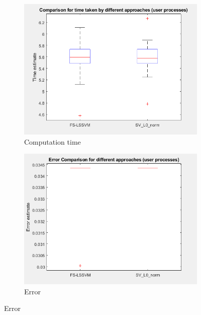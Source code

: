 \documentclass{article}
\begin{document}
        
        \begin{figure}[h]
             \centering
             \begin{subfigure}[b]{0.3\textwidth}
                 \centering
                 \includegraphics[width=\textwidth]{Assignment 3/figures/1_3/time.png}
                 \caption{Computation time}
                 \label{fig:l0computation_time}
             \end{subfigure}
            \hfill
             \begin{subfigure}[b]{0.3\textwidth}
                 \centering
                 \includegraphics[width=\textwidth]{Assignment 3/figures/1_3/error.png}
                 \caption{Error}

\end{subfigure}
\end{figure}
\end{document}
